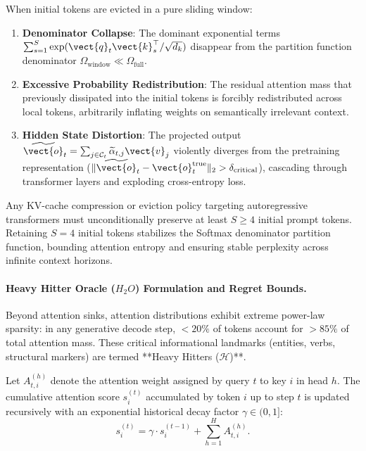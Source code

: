 When initial tokens are evicted in a pure sliding window:
\begin{enumerate}
    \item \textbf{Denominator Collapse}: The dominant exponential terms $\sum_{s=1}^S \exp(\vect{q}_t \vect{k}_s^\top / \sqrt{d_k})$ disappear from the partition function denominator $\Omega_{\text{window}} \ll \Omega_{\text{full}}$.
    \item \textbf{Excessive Probability Redistribution}: The residual attention mass that previously dissipated into the initial tokens is forcibly redistributed across local tokens, arbitrarily inflating weights on semantically irrelevant context.
    \item \textbf{Hidden State Distortion}: The projected output $\widetilde{\vect{o}}_t = \sum_{j \in \mathcal{C}_t} \widetilde{\alpha}_{t, j} \vect{v}_j$ violently diverges from the pretraining representation ($\|\widetilde{\vect{o}}_t - \vect{o}_t^{\text{true}}\|_2 > \delta_{\text{critical}}$), cascading through transformer layers and exploding cross-entropy loss.
\end{enumerate}

\begin{theorem}
\label{thm:attention_sink_law}
Any KV-cache compression or eviction policy targeting autoregressive transformers must unconditionally preserve at least $S \ge 4$ initial prompt tokens. Retaining $S=4$ initial tokens stabilizes the Softmax denominator partition function, bounding attention entropy and ensuring stable perplexity across infinite context horizons.
\end{theorem}

\paragraph{Heavy Hitter Oracle ($H_2O$) Formulation and Regret Bounds.}
Beyond attention sinks, attention distributions exhibit extreme power-law sparsity: in any generative decode step, $<20\%$ of tokens account for $>85\%$ of total attention mass. These critical informational landmarks (entities, verbs, structural markers) are termed **Heavy Hitters ($\mathcal{H}$)**.

Let $A_{t, i}^{(h)}$ denote the attention weight assigned by query $t$ to key $i$ in head $h$. The cumulative attention score $s_i^{(t)}$ accumulated by token $i$ up to step $t$ is updated recursively with an exponential historical decay factor $\gamma \in (0, 1]$:
\begin{equation}
s_i^{(t)} = \gamma \cdot s_i^{(t-1)} + \sum_{h=1}^H A_{t, i}^{(h)}.
\end{equation}

